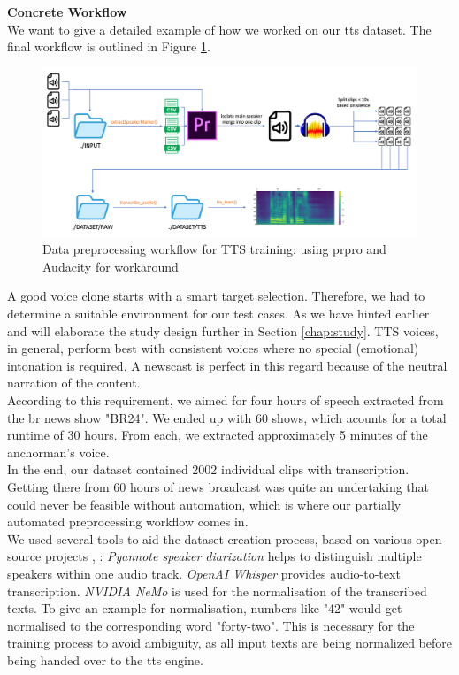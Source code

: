 \documentclass[
  a4paper,  %
  twoside,  %
  bibliography=totoc,
  headsepline,
  cleardoublepage=empty,
  parskip=half,
  draft=false
]{scrbook}
\begin{document}
\textbf{Concrete Workflow} \\
We want to give a detailed example of how we worked on our \gls{tts} dataset. The final workflow is outlined in Figure \ref{fig:dvt-tts-wf}. \\
\begin{figure}[h]
  \centering
  \includegraphics[width=1\textwidth]{./graphics/images/tts/tts prpro.png}
  \caption{Data preprocessing workflow for TTS training: using \gls{prpro} and Audacity for workaround}
  \label{fig:dvt-tts-wf}
\end{figure}
A good voice clone starts with a smart target selection. Therefore, we had to determine a suitable environment for our test cases. As we have hinted earlier and will elaborate the study design further in Section \ref{chap:study}. TTS voices, in general, perform best with consistent voices where no special (emotional) intonation is required. A newscast is perfect in this regard because of the neutral narration of the content. \\
According to this requirement, we aimed for four hours of speech extracted from the \gls{br} news show "BR24". We ended up with 60 shows, which acounts for a total runtime of 30 hours. From each, we extracted approximately 5 minutes of the anchorman's voice.\\
In the end, our dataset contained 2002 individual clips with transcription. Getting there from 60 hours of news broadcast was quite an undertaking that could never be feasible without automation, which is where our partially automated preprocessing workflow comes in. \\
We used several tools to aid the dataset creation process, based on various open-source projects \cite{micaAudioSplitterUsing2023}, \cite{harperEndtoEndToolkitVoice2023}: \textit{Pyannote speaker diarization} helps to distinguish multiple speakers within one audio track. \textit{OpenAI Whisper} provides audio-to-text transcription. \textit{NVIDIA NeMo} is used for the normalisation of the transcribed texts. To give an example for normalisation, numbers like "42" would get normalised to the corresponding word "forty-two". This is necessary for the training process to avoid ambiguity, as all input texts are being normalized before being handed over to the \gls{tts} engine. \\
\end{document}
